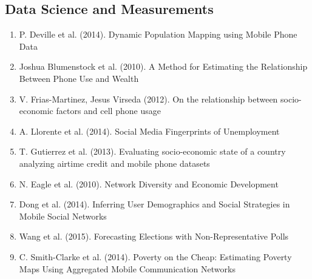 \subsection{Data Science and Measurements}  
\begin{enumerate}  
\item  P. Deville et al. (2014).  Dynamic Population Mapping using Mobile Phone Data\cite{Deville_2014} 
\item  Joshua Blumenstock et al. (2010).  A Method for Estimating the Relationship Between Phone Use and Wealth\cite{blumenstock2010method}  
\item  V. Frias-Martinez, Jesus Virseda (2012).  On the relationship between socio-economic factors and cell phone usage \cite{Frias_Martinez_2012} 
\item A. Llorente et al. (2014).  Social Media Fingerprints of Unemployment\cite{Llorente_2015}  
\item T. Gutierrez et al. (2013).  Evaluating socio-economic state of a country analyzing airtime credit and mobile phone datasets\cite{gutierrez2013evaluating}  
\item N. Eagle et al. (2010).  Network Diversity and Economic Development\cite{eagle2010network}   
\item Dong et al. (2014).  Inferring User Demographics and Social Strategies in Mobile Social Networks \cite{Dong:2014:IUD:2623330.2623703} 
\item Wang et al. (2015).  Forecasting Elections with Non-Representative Polls\cite{Wang2015980} 
\item C. Smith-Clarke et al. (2014).  Poverty on the Cheap: Estimating Poverty Maps Using Aggregated Mobile Communication Networks\cite{Smith-Clarke:2014:PCE:2556288.2557358} 
\end{enumerate}  
